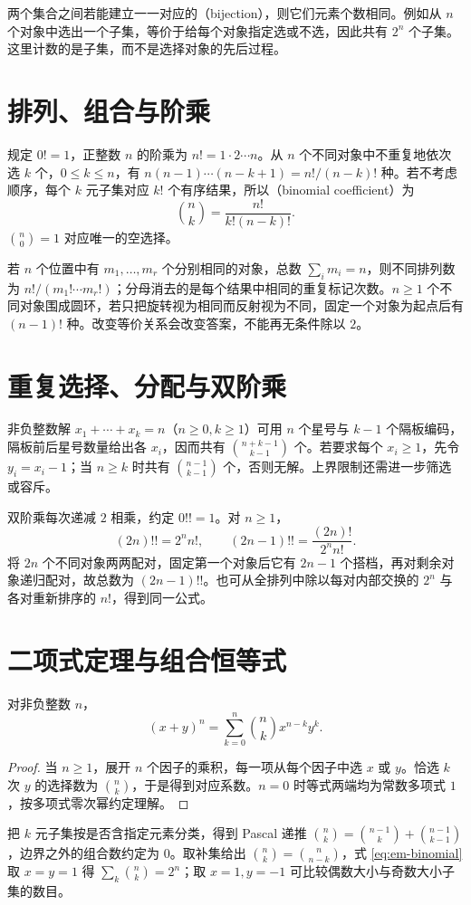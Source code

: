\documentclass[UTF8]{ctexbook}
\begin{document}
两个集合之间若能建立一一对应的（bijection），则它们元素个数相同。例如从 $n$ 个对象中选出一个子集，等价于给每个对象指定选或不选，因此共有 $2^n$ 个子集。这里计数的是子集，而不是选择对象的先后过程。

\section{排列、组合与阶乘}
规定 $0!=1$，正整数 $n$ 的阶乘为 $n!=1\cdot2\cdots n$。从 $n$ 个不同对象中不重复地依次选 $k$ 个，$0\le k\le n$，有 $n(n-1)\cdots(n-k+1)=n!/(n-k)!$ 种。若不考虑顺序，每个 $k$ 元子集对应 $k!$ 个有序结果，所以（binomial coefficient）为
\[
 \binom nk=\frac{n!}{k!(n-k)!}.
\]
$\binom n0=1$ 对应唯一的空选择。

若 $n$ 个位置中有 $m_1,\ldots,m_r$ 个分别相同的对象，总数 $\sum_i m_i=n$，则不同排列数为 $n!/(m_1!\cdots m_r!)$；分母消去的是每个结果中相同的重复标记次数。$n\ge1$ 个不同对象围成圆环，若只把旋转视为相同而反射视为不同，固定一个对象为起点后有 $(n-1)!$ 种。改变等价关系会改变答案，不能再无条件除以 $2$。

\section{重复选择、分配与双阶乘}
非负整数解 $x_1+\cdots+x_k=n$（$n\ge0,k\ge1$）可用 $n$ 个星号与 $k-1$ 个隔板编码，隔板前后星号数量给出各 $x_i$，因而共有 $\binom{n+k-1}{k-1}$ 个。若要求每个 $x_i\ge1$，先令 $y_i=x_i-1$；当 $n\ge k$ 时共有 $\binom{n-1}{k-1}$ 个，否则无解。上界限制还需进一步筛选或容斥。

双阶乘每次递减 $2$ 相乘，约定 $0!!=1$。对 $n\ge1$，
\[
 (2n)!!=2^n n!,\qquad
 (2n-1)!!=\frac{(2n)!}{2^n n!}.
\]
将 $2n$ 个不同对象两两配对，固定第一个对象后它有 $2n-1$ 个搭档，再对剩余对象递归配对，故总数为 $(2n-1)!!$。也可从全排列中除以每对内部交换的 $2^n$ 与各对重新排序的 $n!$，得到同一公式。

\section{二项式定理与组合恒等式}
\begin{theorem}[二项式定理]
对非负整数 $n$，
\begin{equation}\label{eq:em-binomial}
 (x+y)^n=\sum_{k=0}^n\binom nk x^{n-k}y^k.
\end{equation}
\end{theorem}
\begin{proof}
当 $n\ge1$，展开 $n$ 个因子的乘积，每一项从每个因子中选 $x$ 或 $y$。恰选 $k$ 次 $y$ 的选择数为 $\binom nk$，于是得到对应系数。$n=0$ 时等式两端均为常数多项式 $1$，按多项式零次幂约定理解。
\end{proof}
把 $k$ 元子集按是否含指定元素分类，得到 Pascal 递推 $\binom nk=\binom{n-1}k+\binom{n-1}{k-1}$，边界之外的组合数约定为 $0$。取补集给出 $\binom nk=\binom n{n-k}$，式 \eqref{eq:em-binomial} 取 $x=y=1$ 得 $\sum_k\binom nk=2^n$；取 $x=1,y=-1$ 可比较偶数大小与奇数大小子集的数目。
\end{document}
